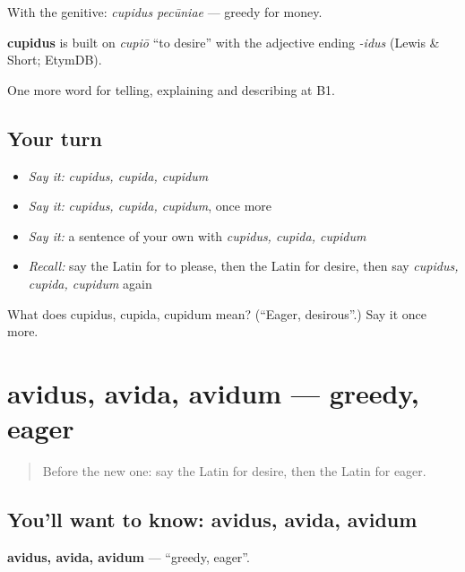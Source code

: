 With the genitive: \emph{cupidus pecūniae} — greedy for money.

\begin{cousinweb}
\textbf{cupidus} is built on \emph{cupiō} \textquotedblleft{}to desire\textquotedblright{} with the adjective ending \emph{-idus} (Lewis \& Short; EtymDB).
\end{cousinweb}

\begin{grammarlens}[title={What you've built}]
One more word for telling, explaining and describing at B1.
\end{grammarlens}

\subsection*{Your turn}
\begin{itemize}
\raggedright
  \item \emph{Say it:} \emph{cupidus, cupida, cupidum}
  \item \emph{Say it:} \emph{cupidus, cupida, cupidum}, once more
  \item \emph{Say it:} a sentence of your own with \emph{cupidus, cupida, cupidum}
  \item \emph{Recall:} say the Latin for to please, then the Latin for desire, then say \emph{cupidus, cupida, cupidum} again
\end{itemize}

\begin{tcolorbox}[breakable,colback=teal!4,colframe=teal!35!black,title={Before you move on}]
What does cupidus, cupida, cupidum mean? (\textquotedblleft{}Eager, desirous\textquotedblright{}.) Say it once more.
\end{tcolorbox}
\section[avidus, avida, avidum]{avidus, avida, avidum — greedy, eager}

\label{lesson:LA-C500-avidus}



\begin{quote}
Before the new one: say the Latin for desire, then the Latin for eager.
\end{quote}

\subsection*{You'll want to know: avidus, avida, avidum}
\textbf{avidus, avida, avidum} — \textquotedblleft{}greedy, eager\textquotedblright{}.

